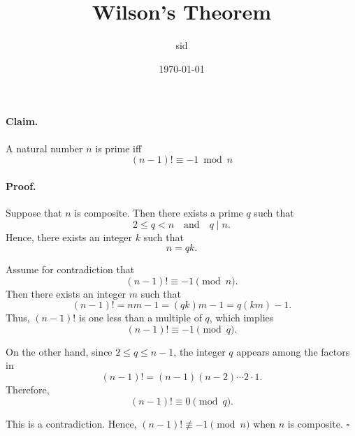 \documentclass{article}
\title{Wilson's Theorem}
\author{sid}
\date{\today}
\begin{document}
\maketitle

\paragraph{Claim.} A natural number $n$ is prime iff
$$
(n-1)! \equiv -1\bmod n
$$

\paragraph{Proof.}
Suppose that $n$ is composite. Then there exists a prime $q$ such that
\[
2 \leq q < n \quad \text{and} \quad q \mid n.
\]
Hence, there exists an integer $k$ such that
\[
n = qk.
\]

Assume for contradiction that
\[
(n-1)! \equiv -1 \pmod{n}.
\]
Then there exists an integer $m$ such that
\[
(n-1)! = nm - 1 = (qk)m - 1 = q(km) - 1.
\]
Thus, $(n-1)!$ is one less than a multiple of $q$, which implies
\[
(n-1)! \equiv -1 \pmod{q}.
\]

On the other hand, since $2 \leq q \leq n-1$, the integer $q$ appears among the factors in
\[
(n-1)! = (n-1)(n-2)\cdots 2 \cdot 1.
\]
Therefore,
\[
(n-1)! \equiv 0 \pmod{q}.
\]

This is a contradiction. Hence,
$
(n-1)! \not\equiv -1 \pmod{n}
$
when $n$ is composite.
\hfill $\square$
\end{document}
